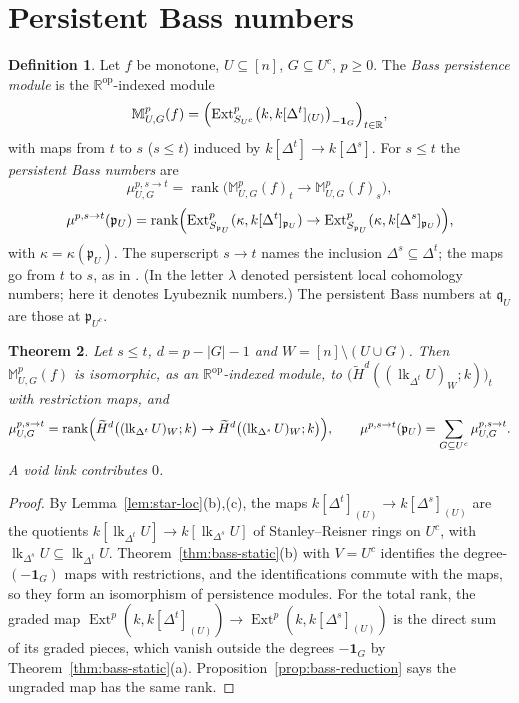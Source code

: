 \documentclass[11pt]{article}
\theoremstyle{plain}
\newtheorem{theorem}{Theorem}[section]
\theoremstyle{definition}
\newtheorem{definition}[theorem]{Definition}
\newcommand{\kk}{k}
\newcommand{\RR}{\mathbb{R}}
\newcommand{\pp}{\mathfrak{p}}
\newcommand{\link}{\operatorname{lk}}
\newcommand{\Ext}{\operatorname{Ext}}
\newcommand{\rank}{\operatorname{rank}}
\newcommand{\rH}{\widetilde{H}}
\newcommand{\one}{\mathbf 1}
\begin{document}
\section{Persistent Bass numbers}\label{sec:bass-persistent}

\begin{definition}\label{def:pers-bass}
Let $f$ be monotone, $U\subseteq[n]$, $G\subseteq U^c$, $p\ge0$. The \emph{Bass persistence module} is the
$\RR^{\mathrm{op}}$-indexed module
\[
\mathbb M^p_{U,G}(f)=\Bigl(\Ext^p_{S_{U^c}}\bigl(\kk,\kk[\Delta^t]_{(U)}\bigr)_{-\one_G}\Bigr)_{t\in\RR},
\]
with maps from $t$ to $s$ ($s\le t$) induced by $\kk[\Delta^t]\to\kk[\Delta^s]$. For $s\le t$ the
\emph{persistent Bass numbers} are
\[
\mu^{p,s\to t}_{U,G}=\rank\bigl(\mathbb M^p_{U,G}(f)_t\to\mathbb M^p_{U,G}(f)_s\bigr),
\]
\[
\mu^{p,s\to t}(\pp_U)=\rank\Bigl(\Ext^p_{S_{\pp_U}}(\kappa,\kk[\Delta^t]_{\pp_U})\to\Ext^p_{S_{\pp_U}}(\kappa,\kk[\Delta^s]_{\pp_U})\Bigr),
\]
with $\kappa=\kappa(\pp_U)$. The superscript $s\to t$ names the inclusion $\Delta^s\subseteq\Delta^t$; the maps
go from $t$ to $s$, as in \cite{SuwayyidWeiGraphs,HeSuwayyidWei}. (In \cite{HeSuwayyidWei} the letter $\lambda$
denoted persistent local cohomology numbers; here it denotes Lyubeznik numbers.) The persistent Bass numbers
at $\mathfrak q_U$ are those at $\pp_{U^c}$.
\end{definition}

\begin{theorem}\label{thm:bass-persistent}
Let $s\le t$, $d=p-|G|-1$ and $W=[n]\setminus(U\cup G)$. Then $\mathbb M^p_{U,G}(f)$ is isomorphic, as an
$\RR^{\mathrm{op}}$-indexed module, to $\bigl(\rH^d((\link_{\Delta^t}U)_W;\kk)\bigr)_t$ with restriction maps, and
\[
\mu^{p,s\to t}_{U,G}=\rank\Bigl(\rH^d\bigl((\link_{\Delta^t}U)_W;\kk\bigr)\to\rH^d\bigl((\link_{\Delta^s}U)_W;\kk\bigr)\Bigr),
\qquad
\mu^{p,s\to t}(\pp_U)=\sum_{G\subseteq U^c}\mu^{p,s\to t}_{U,G}.
\]
A void link contributes $0$.
\end{theorem}

\begin{proof}
By Lemma~\ref{lem:star-loc}(b),(c), the maps $\kk[\Delta^t]_{(U)}\to\kk[\Delta^s]_{(U)}$ are the quotients
$\kk[\link_{\Delta^t}U]\to\kk[\link_{\Delta^s}U]$ of Stanley--Reisner rings on $U^c$, with
$\link_{\Delta^s}U\subseteq\link_{\Delta^t}U$. Theorem~\ref{thm:bass-static}(b) with $V=U^c$ identifies the
degree-$(-\one_G)$ maps with restrictions, and the identifications commute with the maps, so they form an
isomorphism of persistence modules. For the total rank, the graded map
$\Ext^p(\kk,\kk[\Delta^t]_{(U)})\to\Ext^p(\kk,\kk[\Delta^s]_{(U)})$ is the direct sum of its graded pieces,
which vanish outside the degrees $-\one_G$ by Theorem~\ref{thm:bass-static}(a). Proposition~\ref{prop:bass-reduction}
says the ungraded map has the same rank.
\end{proof}
\end{document}
